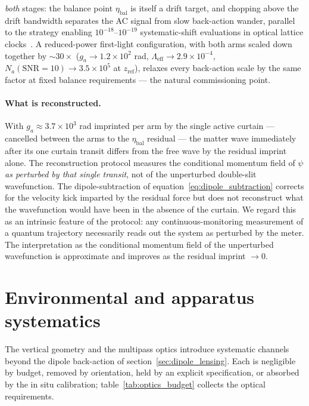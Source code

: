 \documentclass[11pt,a4paper]{article}
\begin{document}
\emph{both} stages: the balance point $\eta_\text{bal}$ is itself a drift target, and chopping above the drift bandwidth separates the AC signal from slow back-action wander, parallel to the strategy enabling $10^{-18}$--$10^{-19}$ systematic-shift evaluations in optical lattice clocks~\cite{Kim2023}. A reduced-power first-light configuration, with both arms scaled down together by $\sim 30\times$ ($g_a \to 1.2\times 10^2$ rad, $\Lambda_\text{eff} \to 2.9\times 10^{-4}$, $N_a(\text{SNR}{=}10) \to 3.5\times 10^5$ at $z_\text{ref}$), relaxes every back-action scale by the same factor at fixed balance requirements --- the natural commissioning point.

\paragraph{What is reconstructed.} With $g_a \approx 3.7\times 10^3$ rad imprinted per arm by the single active curtain --- cancelled between the arms to the $\eta_\text{bal}$ residual --- the matter wave immediately after its one curtain transit differs from the free wave by the residual imprint alone. The reconstruction protocol measures the conditional momentum field of $\psi$ \emph{as perturbed by that single transit}, not of the unperturbed double-slit wavefunction. The dipole-subtraction of equation~\eqref{eq:dipole_subtraction} corrects for the velocity kick imparted by the residual force but does not reconstruct what the wavefunction would have been in the absence of the curtain. We regard this as an intrinsic feature of the protocol: any continuous-monitoring measurement of a quantum trajectory necessarily reads out the system as perturbed by the meter. The interpretation as the conditional momentum field of the unperturbed wavefunction is approximate and improves as the residual imprint $\to 0$.

\section{Environmental and apparatus systematics}
\label{sec:systematics}

The vertical geometry and the multipass optics introduce systematic channels beyond the dipole back-action of section~\ref{sec:dipole_lensing}. Each is negligible by budget, removed by orientation, held by an explicit specification, or absorbed by the in situ calibration; table~\ref{tab:optics_budget} collects the optical requirements.
\end{document}
